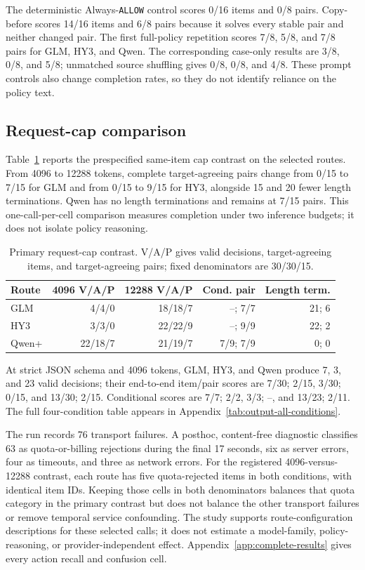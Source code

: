 \documentclass[10pt]{article}
\newcommand{\allow}{\texttt{ALLOW}}
\begin{document}
The deterministic Always-\allow{} control scores 0/16 items and 0/8 pairs. Copy-before scores
14/16 items and 6/8 pairs because it solves every stable pair and neither changed pair. The first
full-policy repetition scores 7/8, 5/8, and 7/8 pairs for GLM, HY3, and Qwen. The corresponding
case-only results are 3/8, 0/8, and 5/8; unmatched source shuffling gives 0/8, 0/8, and 4/8. These
prompt controls also change completion rates, so they do not identify reliance on the policy text.

\subsection{Request-cap comparison}

Table~\ref{tab:output-contract} reports the prespecified same-item cap contrast on the selected
routes. From 4096 to 12288 tokens, complete target-agreeing pairs change from 0/15 to 7/15 for GLM
and from 0/15 to 9/15 for HY3, alongside 15 and 20 fewer length terminations. Qwen has no length
terminations and remains at 7/15 pairs. This one-call-per-cell comparison measures completion under
two inference budgets; it does not isolate policy reasoning.

\begin{table}[H]
\centering
\scriptsize
\setlength{\tabcolsep}{2.7pt}
\caption{Primary request-cap contrast. V/A/P gives valid decisions, target-agreeing items, and
target-agreeing pairs; fixed denominators are 30/30/15.}
\label{tab:output-contract}
\begin{tabular}{@{}lrrrr@{}}
\toprule
Route & 4096 V/A/P & 12288 V/A/P & Cond. pair & Length term. \\
\midrule
GLM & 4/4/0 & 18/18/7 & --; 7/7 & 21; 6 \\
HY3 & 3/3/0 & 22/22/9 & --; 9/9 & 22; 2 \\
Qwen+ & 22/18/7 & 21/19/7 & 7/9; 7/9 & 0; 0 \\
\bottomrule
\end{tabular}
\end{table}

At strict JSON schema and 4096 tokens, GLM, HY3, and Qwen produce 7, 3, and 23 valid decisions;
their end-to-end item/pair scores are 7/30; 2/15, 3/30; 0/15, and 13/30; 2/15. Conditional scores
are 7/7; 2/2, 3/3; --, and 13/23; 2/11. The full four-condition table appears in
Appendix~\ref{tab:output-all-conditions}.

The run records 76 transport failures. A posthoc, content-free diagnostic classifies 63 as
quota-or-billing rejections during the final 17 seconds, six as server errors, four as timeouts,
and three as network errors. For the registered 4096-versus-12288 contrast, each route has five
quota-rejected items in both conditions, with identical item IDs. Keeping those cells in both
denominators balances that quota category in the primary contrast but does not balance the other
transport failures or remove temporal service confounding. The study supports route-configuration
descriptions for these selected calls; it does not estimate a model-family, policy-reasoning, or
provider-independent effect. Appendix~\ref{app:complete-results} gives every action recall and
confusion cell.
\end{document}
